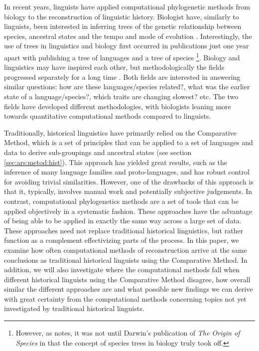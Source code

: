 \documentclass[a4paper,10pt]{article} %
\begin{document}
In recent years, linguists have applied computational phylogenetic methods from biology to the reconstruction of linguistic history. Biologist have, similarly to linguists, been interested in inferring trees of the genetic relationship between species, ancestral states and the tempo and mode of evolution \citep{atkinson2005curious}. Interestingly, the use of trees in linguistics and biology first occurred in publications just one year apart with \citet{schlegel1808sprache} publishing a tree of languages and \citet{lamarck1809philosophie} a tree of species \footnote{However, as 
 \citet[370]{greenhill2015evolution} notes, it was not until Darwin's publication of \emph{The Origin of Species} in  \citeyear{darwin1859origin} that the concept of species trees in biology truly took off.}. Biology and linguistics may have inspired each other, but methodologically the fields progressed separately for a long time \citep[370]{greenhill2015evolution}. Both fields are interested in answering similar questions: how are these languages/species related?, what was the earlier state of a language/species?, which traits are changing slowest? etc. The two fields have developed different methodologies, with biologists leaning more towards quantitative computational methods compared to linguists.
 
Traditionally, historical linguistics have primarily relied on the Comparative Method, which is a set of principles that can be applied to a set of languages and data to derive sub-groupings and ancestral states (see section \ref{sec:ars:metod:hist}). This approach has yielded great results, such as the inference of many language families and proto-languages, and has robust control for avoiding trivial similarities. However, one of the drawbacks of this approach is that it, typically, involves manual work and potentially subjective judgements. In contrast, computational phylogenetics methods are a set of tools that can be applied objectively in a systematic fashion. These approaches have the advantage of being able to be applied in exactly the same way across a large set of data. These approaches need not replace traditional historical linguistics, but rather function as a complement effectivizing parts of the process. In this paper, we examine how often computational methods of reconstruction arrive at the same conclusions as traditional historical linguists using the Comparative Method. In addition, we will also investigate where the computational methods fall when different historical linguists using the Comparative Method disagree, how overall similar the different approaches are and what possible new findings we can derive with great certainty from the computational methods concerning topics not yet investigated by traditional historical linguists.
\end{document}
